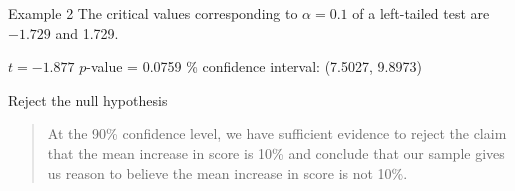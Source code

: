 \documentclass[t]{beamer}
\begin{document}
\begin{frame}{Example 2}
The critical values corresponding to $\alpha = 0.1$ of a left-tailed test are $-1.729$ and 1.729.	\newline\\	\pause

$t = -1.877$	\newline
$p$-value = 0.0759 \% confidence interval: (7.5027, 9.8973)	\newline\\	\pause

Reject the null hypothesis	\newline\\	\pause
\begin{quote}
At the 90\% confidence level, we have sufficient evidence to reject the claim that the mean increase in score is 10\% and conclude that our sample gives us reason to believe the mean increase in score is not 10\%.
\end{quote}
\end{frame}
\end{document}

